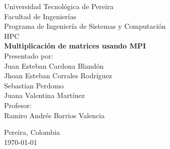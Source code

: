 \begin{titlepage}
    \centering
    \vspace*{0.5cm}
    
    {\Large Universidad Tecnológica de Pereira}\\[0.5cm]
    {\large Facultad de Ingenierías}\\[0.3cm]
    {\large Programa de Ingeniería de Sistemas y Computación}\\[0.3cm]
    {\large HPC}\\[3cm]
    
    {\LARGE\textbf{Multiplicación de matrices usando MPI}}\\[2cm]
        
    {\large Presentado por:}\\[0.3cm]
    {\large Juan Esteban Cardona Blandón}\\[0.3cm]
    {\large Jhoan Esteban Corrales Rodríguez}\\[0.3cm]
    {\large Sebastian Perdomo}\\[0.3cm]
    {\large Juana Valentina Martínez}\\[1cm]
    {\large Profesor:}\\[0.3cm]
    {\large Ramiro Andrés Barrios Valencia}\\[0.3cm]
        
    \vfill
    
    {\large Pereira, Colombia}\\[0.3cm]
    {\large \today}
    
\end{titlepage}
